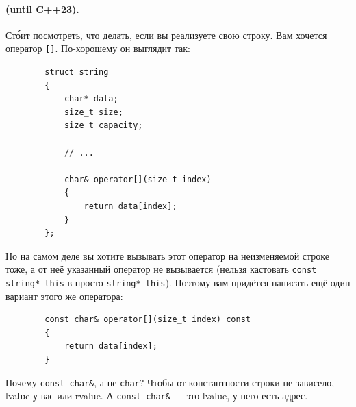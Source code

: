 \documentclass{article}
\begin{document}
    \paragraph{ (until C++23).}
    Ст\'{о}ит посмотреть, что делать, если вы реализуете свою строку. Вам хочется оператор \texttt{[]}. По-хорошему он выглядит так:
    \begin{verbatim}
        struct string
        {
            char* data;
            size_t size;
            size_t capacity;

            // ...

            char& operator[](size_t index)
            {
                return data[index];
            }
        };
    \end{verbatim}
    Но на самом деле вы хотите вызывать этот оператор на неизменяемой строке тоже, а от неё указанный оператор не вызывается (нельзя кастовать \texttt{const string* this} в просто \texttt{string* this}). Поэтому вам придётся написать ещё один вариант этого же оператора:
    \begin{verbatim}
        const char& operator[](size_t index) const
        {
            return data[index];
        }
    \end{verbatim}
    Почему \texttt{const char&}, а не \texttt{char}? Чтобы от константности строки не зависело, lvalue у вас или rvalue. А \texttt{const char&} --- это lvalue, у него есть адрес.
\end{document}
